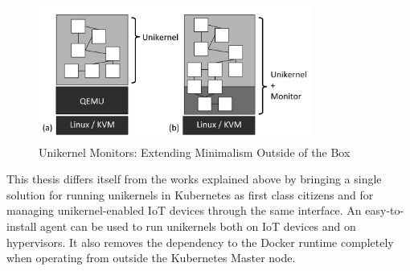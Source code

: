 \begin{figure}[htpb]
    \centering
    \includegraphics[width=0.8\textwidth]{figures/monitors.png}
    \caption{Unikernel Monitors: Extending Minimalism Outside of the Box \cite{Williams2016} } \label{fig:unikernel-monitor}
  \end{figure}



This thesis differs itself from the works explained above by bringing a single solution for running unikernels in Kubernetes as first class citizens and for managing unikernel-enabled IoT devices through the same interface. An easy-to-install agent can be used to run unikernels both on IoT devices and on hypervisors. It also removes the dependency to the Docker runtime completely when operating from outside the Kubernetes Master node.